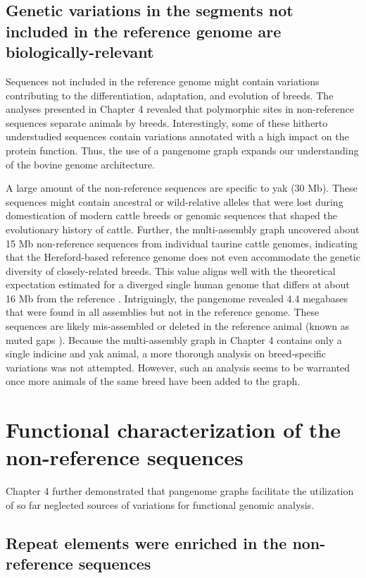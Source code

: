 \documentclass[../main.tex]{subfiles}
\begin{document}
\subsection*{Genetic variations in the segments not included in the reference genome are biologically-relevant}

Sequences not included in the reference genome might contain variations contributing to the differentiation, adaptation, and evolution of breeds. The analyses presented in Chapter 4 revealed that polymorphic sites in non-reference sequences separate animals by breeds. Interestingly, some of these hitherto understudied sequences contain variations annotated with a high impact on the protein function. Thus, the use of a pangenome graph expands our understanding of the bovine genome architecture. 

A large amount of the non-reference sequences are specific to yak (30 Mb). These sequences might contain ancestral or wild-relative alleles that were lost during domestication of modern cattle breeds or genomic sequences that shaped the evolutionary history of cattle. Further, the multi-assembly graph uncovered about 15 Mb non-reference sequences from individual taurine cattle genomes, indicating that the Hereford-based reference genome does not even accommodate the genetic diversity of closely-related breeds. This value aligns well with the theoretical expectation estimated for a diverged single human genome that differs at about 16 Mb from the reference \citep{huddleston2017discovery}. Intriguingly, the pangenome revealed 4.4 megabases that were found in all assemblies but not in the reference genome. These sequences are likely mis-assembled  or deleted in the reference animal (known as muted gaps \citep{audano2019characterizing}). Because the multi-assembly graph in Chapter 4 contains only a single indicine and yak animal, a more thorough analysis on breed-specific variations was not attempted. However, such an analysis seems to be warranted once more animals of the same breed have been added to the graph.

\section{Functional characterization of the non-reference sequences}

Chapter 4 further demonstrated that pangenome graphs facilitate the utilization of so far neglected sources of variations for functional genomic analysis. 

\subsection*{Repeat elements were enriched in the non-reference sequences}
\end{document}

